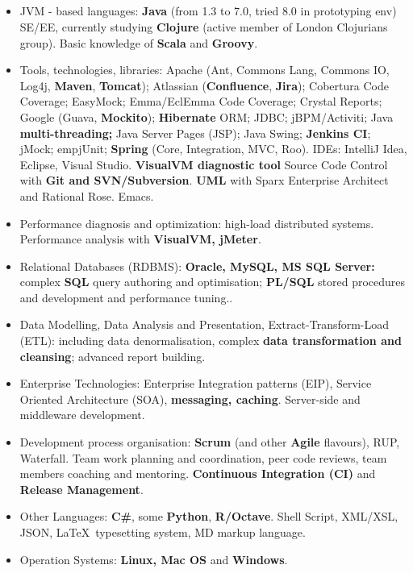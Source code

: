 \documentclass{res}
\newcommand{\osection}[1]{\section{\sc {\Large \textbf{#1}\\}} \vspace{0.30cm}}
\newcommand{\profileItem}[2]{\item {\sc #1:} #2.}
\newcommand{\emp}[1]{{\bf#1}}
\newif\ifFullVersion
\begin{document}
\begin{resume}
\osection{Technical Profile}
\vspace{0.20cm}
\begin{itemize}
\ifFullVersion
  \profileItem {Full software development lifecycle (SLDC)} {requirement gathering and analysis, design, prototyping, implementation, performance tuning, quality assurance (QA) organisation, release management}
  \profileItem {Development process organisation} {\emp{Scrum} (and other \emp{Agile} flavours), RUP, Waterfall. Team work planning and coordination, peer code reviews, team members coaching and mentoring. \emp{Continuous Integration (CI)} and \emp{Release Management}}
\fi
  \profileItem {JVM - based languages} {\emp{Java} (from 1.3 to 7.0, tried 8.0 in prototyping env) SE/EE, currently studying \emp{Clojure} (active member of London Clojurians group). Basic knowledge of \emp{Scala} and \emp{Groovy}}
  \profileItem {Tools, technologies, libraries} {Apache (Ant, Commons Lang, Commons IO, Log4j, \emp{Maven}, \emp{Tomcat}); Atlassian (\emp{Confluence}, \emp{Jira}); Cobertura Code Coverage; EasyMock; Emma/EclEmma Code Coverage; Crystal Reports; Google (Guava, \emp{Mockito}); \emp{Hibernate} ORM; JDBC; jBPM/Activiti; Java \emp{multi-threading;} Java Server Pages (JSP); Java Swing; \emp{Jenkins CI}; jMock; emp{jUnit}; \emp{Spring} (Core, Integration, MVC, Roo). IDEs: IntelliJ Idea, Eclipse, Visual Studio. \emp{VisualVM diagnostic tool} Source Code Control with \emp{Git and SVN/Subversion}. \emp{UML} with Sparx Enterprise Architect and Rational Rose. Emacs}
  \profileItem{Performance diagnosis and optimization} {high-load distributed systems. Performance analysis with \emp{VisualVM, jMeter}}
  \profileItem {Relational Databases (RDBMS)} {\emp{Oracle, MySQL, MS SQL Server:} complex \emp{SQL} query authoring and optimisation; \emp{PL/SQL} stored procedures and development and performance tuning.}
  \profileItem{Data Modelling, Data Analysis and Presentation, Extract-Transform-Load (ETL)} {including data denormalisation, complex \emp{data transformation and cleansing}; advanced report building}
  \profileItem{Enterprise Technologies} {Enterprise Integration patterns (EIP), Service Oriented Architecture (SOA), \emp{messaging, caching}. Server-side and middleware development}
\ifFullVersion
Strong interest in \emp{functional programming}, Data Science and Machine Learning / Business Intelligence systems.
\else
  \profileItem{Development process organisation} {\emp{Scrum} (and other \emp{Agile} flavours), RUP, Waterfall. Team work planning and coordination, peer code reviews, team members coaching and mentoring. \emp{Continuous Integration (CI)} and \emp{Release Management}}
\fi
  \profileItem{Other Languages} {\emp{C\#}, some \emp{Python}, \emp{R/Octave}. Shell Script, XML/XSL, JSON, \LaTeX ~typesetting system, MD markup language}
  \profileItem{Operation Systems} {\emp{Linux, Mac OS} and \emp{Windows}}
\end{itemize}


\end{resume}
\end{document}
